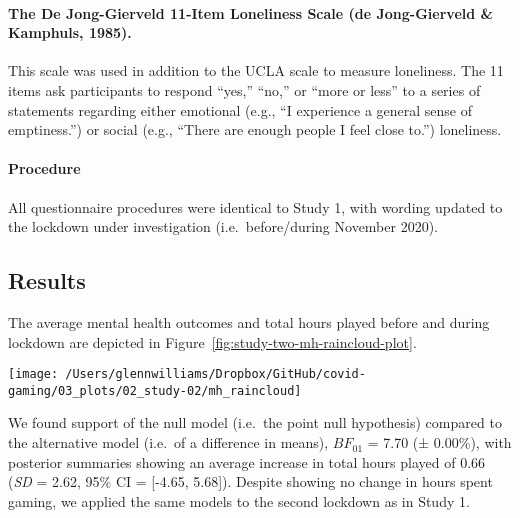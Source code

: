 \documentclass[
  english,
  man,floatsintext]{apa6}
\let\oldparagraph\paragraph
\renewcommand{\paragraph}[1]{\oldparagraph{#1}\mbox{}}
\begin{document}
\hypertarget{the-de-jong-gierveld-11-item-loneliness-scale-de-jong-gierveld-kamphuls-1985.}{%
\paragraph{The De Jong-Gierveld 11-Item Loneliness Scale (de Jong-Gierveld \& Kamphuls, 1985).}\label{the-de-jong-gierveld-11-item-loneliness-scale-de-jong-gierveld-kamphuls-1985.}}

This scale was used in addition to the UCLA scale to measure loneliness. The 11 items ask participants to respond ``yes,'' ``no,'' or ``more or less'' to a series of statements regarding either emotional (e.g., ``I experience a general sense of emptiness.'') or social (e.g., ``There are enough people I feel close to.'') loneliness.

\hypertarget{procedure-1}{%
\paragraph{Procedure}\label{procedure-1}}

All questionnaire procedures were identical to Study 1, with wording updated to the lockdown under investigation (i.e.~before/during November 2020).

\hypertarget{results-1}{%
\subsection{Results}\label{results-1}}

The average mental health outcomes and total hours played before and during lockdown are depicted in Figure~\ref{fig:study-two-mh-raincloud-plot}.

\begin{figure*}[!htbp]

{\centering \texttt{[image: /Users/glennwilliams/Dropbox/GitHub/covid-gaming/03\_plots/02\_study-02/mh\_raincloud]} 

}

\caption{Mental health outcomes for the depression, anxiety, stress, and loneliness along with total hours played before and during lockdown. Dots represent individual participants' mean (jittered) scores.}\label{fig:study-two-mh-raincloud-plot}
\end{figure*}

We found support of the null model (i.e.~the point null hypothesis) compared to the alternative model (i.e.~of a difference in means), \(BF_{01}\) = 7.70 (± 0.00\%), with posterior summaries showing an average increase in total hours played of 0.66 (\emph{SD} = 2.62, 95\% CI = {[}-4.65, 5.68{]}). Despite showing no change in hours spent gaming, we applied the same models to the second lockdown as in Study 1.
\end{document}
